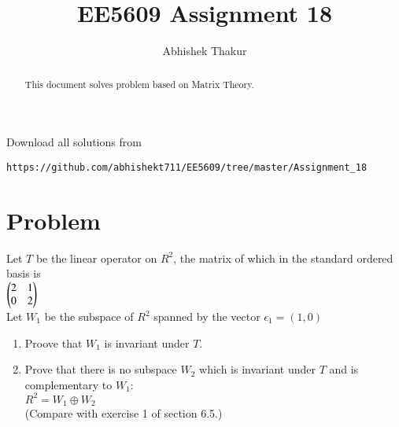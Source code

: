\documentclass[journal,12pt,onecolumn]{IEEEtran}
\begin{document}
     \def\rightbox#1{\makebox[0in][r]{#1}}
     \def\centbox#1{\makebox[0in]{#1}}
     \def\topbox#1{\raisebox{-\baselineskip}[0in][0in]{#1}}
     \def\midbox#1{\raisebox{-0.5\baselineskip}[0in][0in]{#1}}
\vspace{3cm}
\title{EE5609 Assignment 18}
\author{Abhishek Thakur}
\maketitle
\bigskip
\renewcommand{\thefigure}{\theenumi}
\renewcommand{\thetable}{\theenumi}
\renewcommand{\labelenumi}{\alph{enumi})}
\begin{abstract}
This document solves problem based on Matrix Theory.
\end{abstract}
Download all solutions from 
\begin{lstlisting}
https://github.com/abhishekt711/EE5609/tree/master/Assignment_18
\end{lstlisting}
\section{Problem}
Let $T$ be the linear operator on $R^2$, the matrix of which in the standard ordered basis is \\
$\begin{pmatrix}2&1\\0&2\end{pmatrix}$\\
Let $W_1$ be the subspace of $R^2$ spanned by the vector $\epsilon_1=(1,0)$
\begin{enumerate}
\item Proove that $W_1$ is invariant under $T$.
\item Prove that there is no subspace $W_2$ which is invariant under $T$ and is complementary to $W_1$:\\
$R^2=W_1\oplus W_2$\\
(Compare with exercise 1 of section 6.5.)
\end{enumerate}
\end{document}
